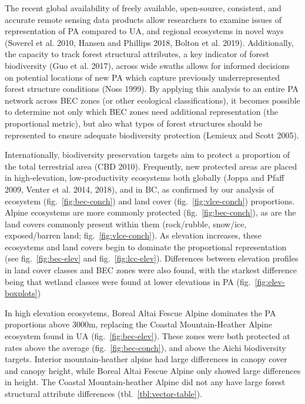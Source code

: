 \documentclass[11pt]{article}
\begin{document}
The recent global availability of freely available, open-source,
consistent, and accurate remote sensing data products allow researchers
to examine issues of representation of PA compared to UA, and regional
ecosystems in novel ways (Soverel et al. 2010, Hansen and Phillips 2018,
Bolton et al. 2019). Additionally, the capacity to track forest
structural attributes, a key indicator of forest biodiversity (Guo et
al. 2017), across wide swaths allows for informed decisions on potential
locations of new PA which capture previously underrepresented forest
structure conditions (Noss 1999). By applying this analysis to an entire
PA network across BEC zones (or other ecological classifications), it
becomes possible to determine not only which BEC zones need additional
representation (the proportional metric), but also what types of forest
structures should be represented to ensure adequate biodiversity
protection (Lemieux and Scott 2005).

Internationally, biodiversity preservation targets aim to protect a
proportion of the total terrestrial area (CBD 2010). Frequently, new
protected areas are placed in high-elevation, low-productivity
ecosystems both globally (Joppa and Pfaff 2009, Venter et al. 2014,
2018), and in BC, as confirmed by our analysis of ecosystem
(fig.~\ref{fig:bec-conch}) and land cover (fig.~\ref{fig:vlce-conch})
proportions. Alpine ecosystems are more commonly protected
(fig.~\ref{fig:bec-conch}), as are the land covers commonly present
within them (rock/rubble, snow/ice, exposed/barren land;
fig.~\ref{fig:vlce-conch}). As elevation increases, these ecosystems and
land covers begin to dominate the proportional representation (see
fig.~\ref{fig:bec-elev} and fig.~\ref{fig:lcc-elev}). Differences
between elevation profiles in land cover classes and BEC zones were also
found, with the starkest difference being that wetland classes were
found at lower elevations in PA (fig.~\ref{fig:elev-boxplots})

In high elevation ecosystems, Boreal Altai Fescue Alpine dominates the
PA proportions above 3000m, replacing the Coastal Mountain-Heather
Alpine ecosystem found in UA (fig.~\ref{fig:bec-elev}). These zones were
both protected at rates above the average (fig.~\ref{fig:bec-conch}),
and above the Aichi biodiversity targets. Interior mountain-heather
alpine had large differences in canopy cover and canopy height, while
Boreal Altai Fescue Alpine only showed large differences in height. The
Coastal Mountain-heather Alpine did not any have large forest structural
attribute differences (tbl.~\ref{tbl:vector-table}).
\end{document}
